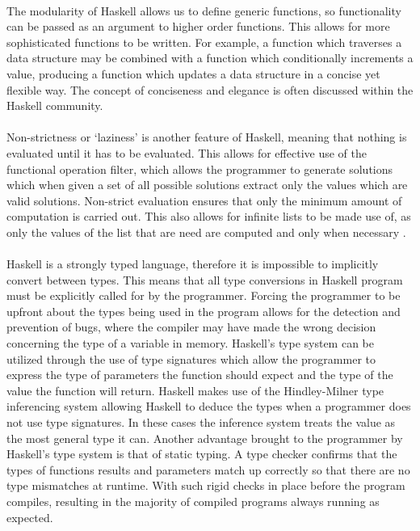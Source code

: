 \documentclass[main.tex]{subfiles}
\begin{document}
{{\paragraph{}The modularity of Haskell allows us to define generic functions, so functionality can be passed as an argument to higher order functions. This allows for more sophisticated functions to be written. For example, a function which traverses a data structure may be combined with a function which conditionally increments a value, producing a function which updates a data structure in a concise yet flexible way. The concept of conciseness and elegance is often discussed within the Haskell community.

\paragraph{}Non-strictness or `laziness' is another feature of Haskell, meaning that nothing is evaluated until it has to be evaluated. This allows for effective use of the functional operation filter, which allows the programmer to generate solutions which when given a set of all possible solutions extract only the values which are valid solutions. Non-strict evaluation ensures that only the minimum amount of computation is carried out. This also allows for infinite lists to be made use of, as only the values of the list that are need are computed and only when necessary \cite{Lipovaca2010}.

\paragraph{}Haskell is a strongly typed language, therefore it is impossible to implicitly convert between types. This means that all type conversions in Haskell program must be explicitly called for by the programmer. Forcing the programmer to be upfront about the types being used in the program allows for the detection and prevention of bugs, where the compiler may have made the wrong decision concerning the type of a variable in memory. Haskell's type system can be utilized through the use of type signatures which allow the programmer to express the type of parameters the function should expect and the type of the value the function will return. Haskell makes use of the Hindley-Milner type inferencing system allowing Haskell to deduce the types when a programmer does not use type signatures.\cite{Marlow2010} In these cases the inference system treats the value as the most general type it can. Another advantage brought to the programmer by Haskell's type system is that of static typing. A type checker confirms that the types of functions results and parameters match up correctly so that there are no type mismatches at runtime. With such rigid checks in place before the program compiles, resulting in the majority of compiled programs always running as expected.

}}
\end{document}
